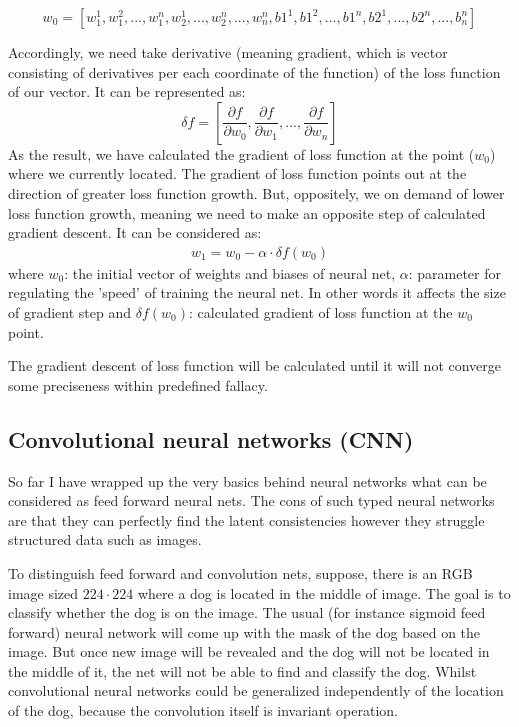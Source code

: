 \[ w_0 = [w_1^1, w_1^2,...,w_1^n, w_2^1,...,w_2^n,...,w_n^n, b1^1, b1^2,...,b1^n, b2^1,...,b2^n,...,b_n^n] \]

Accordingly, we need take derivative (meaning gradient, which is vector consisting of derivatives per each coordinate of the function) of the loss function of our vector. It can be represented as:
\[ \delta{f} = [\frac{\partial{f}}{\partial{w_0}}, \frac{\partial{f}}{\partial{w_1}}, ... ,\frac{\partial{f}}{\partial{w_n}} ] \]
As the result, we have calculated the gradient of loss function at the point ($w_0$) where we currently located. The gradient of loss function points out at the direction of greater loss function growth. But, oppositely, we on demand of lower loss function growth, meaning we need to make an opposite step of calculated gradient descent. It can be considered as:
\begin{align*}
w_1 = w_0 - \alpha \cdot \delta{f(w_0)}
\end{align*}
where $w_0$: the initial vector of weights and biases of neural net, $\alpha$: parameter for regulating the 'speed' of training the neural net. In other words it affects the size of gradient step and $\delta{f(w_0)}$: calculated gradient of loss function at the $w_0$ point. 

The gradient descent of loss function will be calculated until it will not converge some preciseness within predefined fallacy.

\subsection{Convolutional neural networks (CNN)}
So far I have wrapped up the very basics behind neural networks what can be considered as feed forward neural nets. The cons of such typed neural networks are that they can perfectly find the latent consistencies however they struggle structured data such as images.

To distinguish feed forward and convolution nets, suppose, there is an RGB image sized $224 \cdot 224$ where a dog is located in the middle of image. The goal is to classify whether the dog is on the image. The usual (for instance sigmoid feed forward) neural network will come up with the mask of the dog based on the image. But once new image will be revealed and the dog will not be located in the middle of it, the net will not be able to find and classify the dog. Whilst convolutional neural networks could be generalized independently of the location of the dog, because the convolution itself is invariant operation.         

